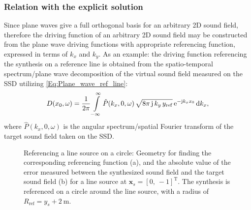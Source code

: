 \subsubsection{Relation with the explicit solution}
Since plane waves give a full orthogonal basis for an arbitrary 2D sound field, therefore the driving function of an arbitrary 2D sound field may be constructed from the plane wave driving functions with appropriate referencing function, expressed in terms of $k_x$ and $k_y$.  As an example: the driving function referencing the synthesis on a reference line is obtained from the spatio-temporal spectrum/plane wave decomposition of the virtual sound field measured on the SSD utilizing \eqref{Eq:Plane_wave_ref_line}: %
\begin{equation}
D(x_0,\omega) = \frac{1}{2\pi} \int\limits_{-\infty}^{\infty} \hat{P}(k_x,0,\omega) \,\sqrt{8\pi\,\mathrm{j}\,k_y\,y_{\mathrm{ref}}} 
\,\mathrm{e}^{-\mathrm{j} k_x x_0}\,
 \mathrm{d} k_x,
	\label{Eq:General_WFS_in_kx_domain}
\end{equation}
where $\hat{P}(k_x,0,\omega)$ is the angular spectrum/spatial Fourier transform of the target sound field taken on the SSD.

\begin{figure} 
	\centering
	\hspace{10mm}
\caption{Referencing a line source on a circle: Geometry for finding the corresponding referencing function (a), and the absolute value of the error measured between the synthesized sound field and the target sound field (b) for a line source at $\mathbf{x}_s = [0,\ -1]^{\mathrm{T}}$. The synthesis is referenced on a circle around the line source, with a radius of $R_{\mathrm{ref}} = y_s + 2 ~\mathrm{m}$. }
	\label{Fig:Theory:circle_referencing}
\end{figure}

